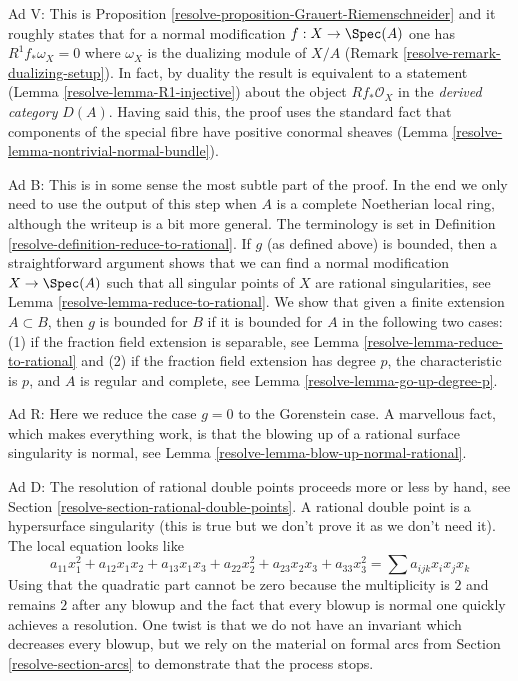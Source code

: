 \medskip\noindent
Ad V: This is Proposition \ref{resolve-proposition-Grauert-Riemenschneider}
and it roughly states that for a normal modification $f : X \to \Spec(A)$
one has $R^1f_*\omega_X = 0$ where $\omega_X$ is the dualizing module
of $X/A$ (Remark \ref{resolve-remark-dualizing-setup}).
In fact, by duality the result is equivalent to a statement
(Lemma \ref{resolve-lemma-R1-injective})
about the object $Rf_*\mathcal{O}_X$ in the {\it derived category} $D(A)$.
Having said this, the proof uses the standard fact that
components of the special fibre have positive conormal
sheaves (Lemma \ref{resolve-lemma-nontrivial-normal-bundle}).

\medskip\noindent
Ad B: This is in some sense the most subtle part of the proof.
In the end we only need to use the output of this step when $A$
is a complete Noetherian local ring, although the writeup is a
bit more general. The terminology is set in
Definition \ref{resolve-definition-reduce-to-rational}.
If $g$ (as defined above) is bounded, then a straightforward
argument shows that we can find a normal modification $X \to \Spec(A)$
such that all singular points of $X$ are rational singularities, see
Lemma \ref{resolve-lemma-reduce-to-rational}. We show that given a finite extension
$A \subset B$, then $g$ is bounded for $B$ if it is bounded for $A$
in the following two cases: (1) if the fraction field extension
is separable, see Lemma \ref{resolve-lemma-reduce-to-rational} and
(2) if the fraction field extension has degree $p$,
the characteristic is $p$, and $A$ is regular and complete, see
Lemma \ref{resolve-lemma-go-up-degree-p}.

\medskip\noindent
Ad R: Here we reduce the case $g = 0$ to the Gorenstein case.
A marvellous fact, which makes everything work, is that the
blowing up of a rational surface singularity is normal, see
Lemma \ref{resolve-lemma-blow-up-normal-rational}.

\medskip\noindent
Ad D: The resolution of rational double points proceeds more or
less by hand, see
Section \ref{resolve-section-rational-double-points}.
A rational double point
is a hypersurface singularity (this is true but we don't prove it
as we don't need it). The local equation looks like
$$
a_{11} x_1^2 + a_{12} x_1x_2 + a_{13}x_1x_3 + a_{22} x_2^2 +
a_{23} x_2x_3 + a_{33} x_3^2 =
\sum a_{ijk} x_ix_jx_k
$$
Using that the quadratic part cannot be zero because the multiplicity
is $2$ and remains $2$ after any blowup and the fact that every blowup
is normal one quickly achieves a resolution. One twist is that we
do not have an invariant which decreases every blowup, but we rely
on the material on formal arcs from Section \ref{resolve-section-arcs}
to demonstrate that the process stops.


